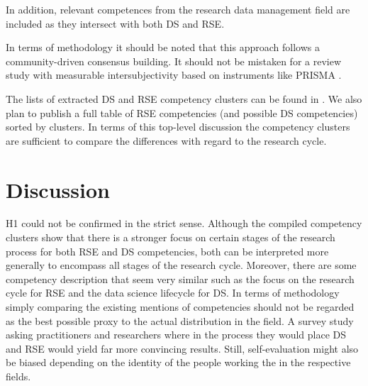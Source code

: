 \documentclass[
        english,biblatex
    ]{lni}
\begin{document}
    In addition, relevant competences from the research data management
    field \autocite{petersen_2025_15025246} are included as they
    intersect with both DS and RSE.

    In terms of methodology it should be noted that this approach
    follows a community-driven consensus building. It should not be
    mistaken for a review study with measurable intersubjectivity based
    on instruments like PRISMA \autocite{Page2021PRISMA}.

    The lists of extracted DS and RSE competency clusters can be found
    in \autocite{ds2rse2025}. We also plan to publish a full table of
    RSE competencies (and possible DS competencies) sorted by clusters.
    In terms of this top-level discussion the competency clusters are
    sufficient to compare the differences with regard to the research
    cycle.

    \section{Discussion}\label{discussion}

    H1 could not be confirmed in the strict sense. Although the compiled
    competency clusters show that there is a stronger focus on certain
    stages of the research process for both RSE and DS competencies,
    both can be interpreted more generally to encompass all stages of
    the research cycle. Moreover, there are some competency description
    that seem very similar such as the focus on the research cycle for
    RSE and the data science lifecycle for DS. In terms of methodology
    simply comparing the existing mentions of competencies should not be
    regarded as the best possible proxy to the actual distribution in
    the field. A survey study asking practitioners and researchers where
    in the process they would place DS and RSE would yield far more
    convincing results. Still, self-evaluation might also be biased
    depending on the identity of the people working the in the
    respective fields.
\end{document}
